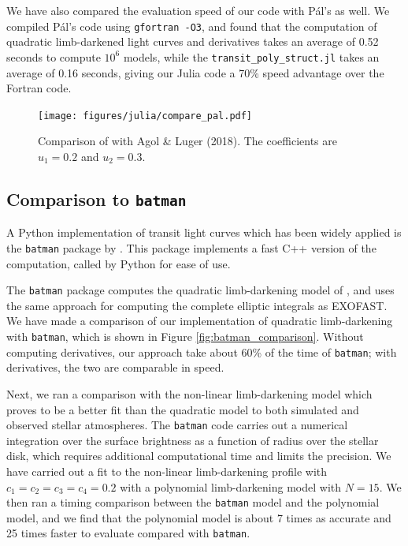 \documentclass[modern]{aastex61}
\begin{document}
We have also compared the evaluation speed of our code with P\'al's as well.
We compiled P\'al's code using \texttt{gfortran -O3}, and found that
the computation of quadratic limb-darkened light curves and
derivatives takes an average of 0.52 seconds to compute $10^6$ models,
while the \texttt{transit\_poly\_struct.jl} takes an average of 0.16 seconds,
giving our Julia code a 70\% speed advantage over the Fortran code.

\begin{figure}
    \begin{centering}
    \texttt{[image: figures/julia/compare\_pal.pdf]}
    \caption{Comparison of \citet{Pal2008} with Agol \& Luger (2018).  The
    coefficients are $u_1=0.2$ and $u_2=0.3$. }
    \label{fig:Pal_comparison}
    \end{centering}
\end{figure}

\subsection{Comparison to \texttt{batman}}

A Python implementation of transit light curves which has been widely applied
is the \texttt{batman} package by \citet{Kreidberg2015}.  This package
implements a fast C++ version of the computation, called by Python for
ease of use.

The \texttt{batman} package computes the quadratic limb-darkening model
of \citet{MandelAgol2002}, and uses the same approach for computing
the complete elliptic integrals as EXOFAST.  We have made a comparison
of our implementation of quadratic limb-darkening with \texttt{batman},
which is shown in Figure \ref{fig:batman_comparison}.  Without computing
derivatives, our approach take about 60\% of the time of \texttt{batman};
with derivatives, the two are comparable in speed.

Next, we ran a comparison with the non-linear limb-darkening model which
proves to be a better fit than the quadratic model to both simulated
and observed stellar atmospheres.  The \texttt{batman} code carries out
a numerical integration over the surface brightness as a function of
radius over the stellar disk, which requires additional computational
time and limits the precision.  We have carried out a fit to the
non-linear limb-darkening profile with $c_1=c_2=c_3=c_4=0.2$ with a
polynomial limb-darkening model with $N=15$.  We then ran a timing
comparison between the \texttt{batman} model and the polynomial
model, and we find that the polynomial model is about 7 times
as accurate and 25 times faster to evaluate compared with \texttt{batman}.
\end{document}
